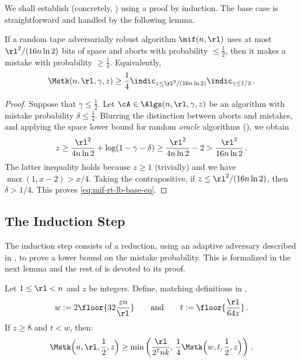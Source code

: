 \begin{itemize}
\begin{itemize}
We shall establish  (concretely, ) using
a proof by induction. The base case is straightforward and handled by the
following lemma.

\begin{lemma}\label{lem:mif-rt-lb-base-case}
  If a random tape adversarially robust algorithm $\mif(n,\rl)$ uses at most
  $\rl^2/(16 n \ln 2)$ bits of space and aborts with probability $\le \frac12$,
  then it makes a mistake with probability $\ge \frac14$. Equivalently,
  \begin{align}
    \Mstk(n,\rl,\gamma,z) 
    \ge \frac{1}{4} \indic_{z \le \rl^2 / (16 n \ln 2)} \indic_{\gamma \le 1/2} \,.
    \label{eq:mif-rt-lb-base-eq}
  \end{align}
\end{lemma}
%
\begin{proof}%
  Suppose that $\gamma \le \frac12$. Let $\cA \in \Algs(n,\rl,\gamma,z)$ be an
  algorithm with mistake probability $\delta \le \frac14$. Blurring the
  distinction between aborts and mistakes, and applying the space lower bound
  for random {\em oracle} algorithms (), we obtain
  \begin{align*}
    z \ge \frac{\rl^2}{4 n \ln 2} + \log(1 - \gamma - \delta) 
    \ge \frac{\rl^2}{4 n \ln 2} - 2 > \frac{\rl^2}{16 n \ln 2} \,.
  \end{align*}
  The latter inequality holds because $z \ge 1$ (trivially) and we have
  $\max(1, x-2) > x/4$. Taking the contrapositive, if $z \le \rl^2 / (16 n \ln
  2)$, then $\delta > 1/4$. This proves \cref{eq:mif-rt-lb-base-eq}.
\end{proof}

\subsection{The Induction Step} \label{subsec:rt-ind-step}

The induction step consists of a reduction, using an adaptive adversary
described in , to prove a lower bound on the
mistake probability. This is formalized in the next lemma and the rest of
 is devoted to its proof.

\begin{lemma}\label{lem:mif-rt-lb-step}
  Let $1 \le \rl < n$ and $z$ be integers. Define, matching definitions in ,
  \begin{align}
    w := 2 \floor{32 \frac{z n}{\rl}} \qquad \text{and} \qquad 
    t := \floor{\frac{\rl}{64 z}} \,.
    \label{eq:w-t-def}
  \end{align}
  If $z \ge 8$ and $t < w$, then:
  \begin{align}
    \Mstk\Big(n,\rl,\frac{1}{2},z\Big) \ge \min\left( \frac{\rl}{2^7 n k}, \,
      \frac{1}{4} \Mstk\Big(w,t,\frac{1}{2},z\Big) \right) \,. 
      \label{eq:mif-rt-lb-step-err}
  \end{align}
\end{lemma}


\end{itemize}
\end{itemize}

